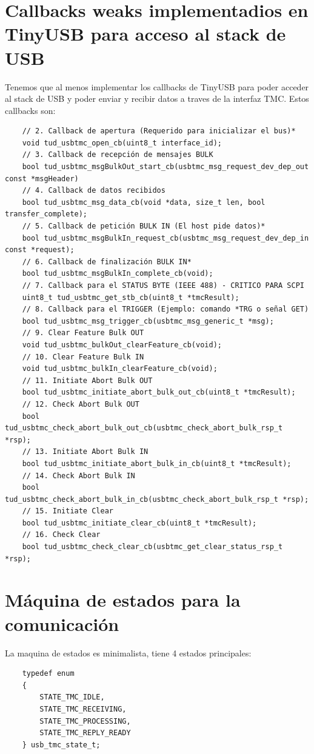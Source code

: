 \section{Callbacks weaks implementadios en TinyUSB para acceso al stack de USB}
Tenemos que al menos implementar los callbacks de TinyUSB para poder acceder al stack de USB y poder enviar y recibir datos a traves de la interfaz TMC. Estos callbacks son:
\begin{verbatim}
    // 2. Callback de apertura (Requerido para inicializar el bus)*
    void tud_usbtmc_open_cb(uint8_t interface_id);
    // 3. Callback de recepción de mensajes BULK
    bool tud_usbtmc_msgBulkOut_start_cb(usbtmc_msg_request_dev_dep_out const *msgHeader)
    // 4. Callback de datos recibidos
    bool tud_usbtmc_msg_data_cb(void *data, size_t len, bool transfer_complete);
    // 5. Callback de petición BULK IN (El host pide datos)*
    bool tud_usbtmc_msgBulkIn_request_cb(usbtmc_msg_request_dev_dep_in const *request);
    // 6. Callback de finalización BULK IN*
    bool tud_usbtmc_msgBulkIn_complete_cb(void);
    // 7. Callback para el STATUS BYTE (IEEE 488) - CRITICO PARA SCPI
    uint8_t tud_usbtmc_get_stb_cb(uint8_t *tmcResult);
    // 8. Callback para el TRIGGER (Ejemplo: comando *TRG o señal GET)
    bool tud_usbtmc_msg_trigger_cb(usbtmc_msg_generic_t *msg);
    // 9. Clear Feature Bulk OUT
    void tud_usbtmc_bulkOut_clearFeature_cb(void);
    // 10. Clear Feature Bulk IN
    void tud_usbtmc_bulkIn_clearFeature_cb(void);
    // 11. Initiate Abort Bulk OUT
    bool tud_usbtmc_initiate_abort_bulk_out_cb(uint8_t *tmcResult);
    // 12. Check Abort Bulk OUT
    bool tud_usbtmc_check_abort_bulk_out_cb(usbtmc_check_abort_bulk_rsp_t *rsp);
    // 13. Initiate Abort Bulk IN
    bool tud_usbtmc_initiate_abort_bulk_in_cb(uint8_t *tmcResult);
    // 14. Check Abort Bulk IN
    bool tud_usbtmc_check_abort_bulk_in_cb(usbtmc_check_abort_bulk_rsp_t *rsp);
    // 15. Initiate Clear
    bool tud_usbtmc_initiate_clear_cb(uint8_t *tmcResult);
    // 16. Check Clear
    bool tud_usbtmc_check_clear_cb(usbtmc_get_clear_status_rsp_t *rsp);
\end{verbatim}

\section{Máquina de estados para la comunicación}
La maquina de estados es minimalista, tiene 4 estados principales: 
\begin{verbatim}
    typedef enum
    {
        STATE_TMC_IDLE,
        STATE_TMC_RECEIVING,
        STATE_TMC_PROCESSING,
        STATE_TMC_REPLY_READY
    } usb_tmc_state_t;
\end{verbatim}

